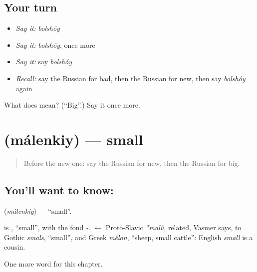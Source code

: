 \subsection*{Your turn}
\begin{itemize}
\raggedright
  \item \emph{Say it:} \emph{bolshóy}
  \item \emph{Say it:} \emph{bolshóy}, once more
  \item \emph{Say it:} say \emph{bolshóy}
  \item \emph{Recall:} say the Russian for bad, then the Russian for new, then say \emph{bolshóy} again
\end{itemize}

\begin{tcolorbox}[breakable,colback=teal!4,colframe=teal!35!black,title={Before you move on}]
What does  mean? (\textquotedblleft{}Big\textquotedblright{}.) Say it once more.
\end{tcolorbox}
\section[\texorpdfstring{\ru{маленький} (málenkiy)}{маленький (málenkiy)}]{ (málenkiy) — small}

\label{lesson:RU-C65-small}



\begin{quote}
Before the new one: say the Russian for new, then the Russian for big.
\end{quote}

\subsection*{You'll want to know: }
\textbf{} (\emph{málenkiy}) — \textquotedblleft{}small\textquotedblright{}.

\begin{cousinweb}
\textbf{} is \emph{}, \textquotedblleft{}small\textquotedblright{}, with the fond \emph{-}. \emph{} $\leftarrow$ Proto-Slavic \emph{*malŭ}, related, Vasmer says, to Gothic \emph{smals}, \textquotedblleft{}small\textquotedblright{}, and Greek \emph{mêlon}, \textquotedblleft{}sheep, small cattle\textquotedblright{}: English \emph{small} is a cousin.
\end{cousinweb}

\begin{grammarlens}[title={What you've built}]
One more word for this chapter.
\end{grammarlens}

